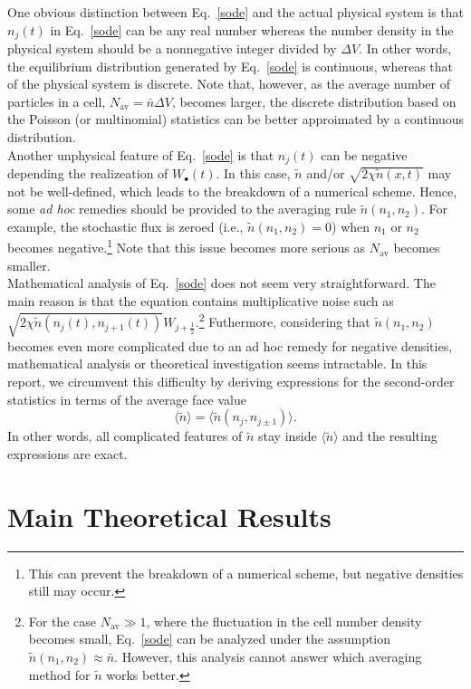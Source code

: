 \documentclass{article}
\newcommand{\dV}{{\Delta V}}
\newcommand{\avgntilde}{{\langle\tilde{n}\rangle}}
\newcommand{\nb}{\bar{n}}
\newcommand{\Nav}{{N_\mathrm{av}}}
\begin{document}
One obvious distinction between Eq.~\eqref{sode} and the actual physical system is that $n_j(t)$ in Eq.~\eqref{sode} can be any real number whereas the number density in the physical system should be a nonnegative integer divided by $\dV$. 
In other words, the equilibrium distribution generated by Eq.~\eqref{sode} is continuous, whereas that of the physical system is discrete.
Note that, however, as the average number of particles in a cell, $\Nav=\nb\dV$, becomes larger, the discrete distribution based on the Poisson (or multinomial) statistics can be better approimated by a continuous distribution.
\\

Another unphysical feature of Eq.~\eqref{sode} is that $n_j(t)$ can be negative  depending the realizeation of $W_\bullet(t)$.
In this case, $\tilde{n}$ and/or $\sqrt{2\chi \tilde{n}(x,t)}$ may not be well-defined, which leads to the breakdown of a numerical scheme.
Hence, some \textit{ad hoc} remedies should be provided to the averaging rule $\tilde{n}(n_1,n_2)$.
For example, the stochastic flux is zeroed (i.e., $\tilde{n}(n_1,n_2)=0$) when $n_1$ or $n_2$ becomes negative.\footnote{This can prevent the breakdown of a numerical scheme, but negative densities still may occur.}
Note that this issue becomes more serious as $\Nav$ becomes smaller.
\\

Mathematical analysis of Eq.~\eqref{sode} does not seem very straightforward.
The main reason is that the equation contains multiplicative noise such as $\sqrt{2\chi\tilde{n}(n_j(t),n_{j+1}(t))}W_{j+\frac12}$.\footnote{For the case $\Nav\gg 1$, where the fluctuation in the cell number density becomes small, Eq.~\eqref{sode} can be analyzed under the assumption $\tilde{n}(n_1,n_2)\approx \nb$. However, this analysis cannot answer which averaging method for $\tilde{n}$ works better.}
Futhermore, considering that $\tilde{n}(n_1,n_2)$ becomes even more complicated due to an ad hoc remedy for negative densities, mathematical analysis or theoretical investigation seems intractable. 
In this report, we circumvent this difficulty by deriving expressions for the second-order statistics in terms of the average face value
\begin{equation}
\avgntilde=\langle\tilde{n}(n_j,n_{j\pm1})\rangle.
\end{equation}
In other words, all complicated features of $\tilde{n}$ stay inside $\avgntilde$ and the resulting expressions are exact.

\section{Main Theoretical Results}
\end{document}
